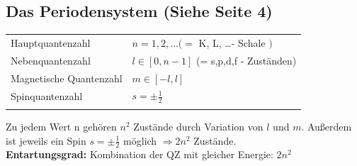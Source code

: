 \begin{sectionbox}
    \subsection{Das Periodensystem (Siehe Seite 4)}
    \begin{tabular*}{\columnwidth}{@{\extracolsep\fill}ll@{}}
        \ctrule
        Hauptquantenzahl &
        $n = 1, 2, \ldots (= $ K, L, \ldots - Schale $)$ \\
        Nebenquantenzahl &
        $l \in [0,n-1]$ (= s,p,d,f - Zuständen)\\
        Magnetische Quantenzahl &
        $m \in [-l,l]$\\
        Spinquantenzahl &
        $s = \pm \frac{1}{2}$ \\
        \ctrule
    \end{tabular*}
    Zu jedem Wert n gehören $n^2$ Zustände durch Variation von $l$ und $m$. Außerdem ist jeweils ein Spin $s = \pm \frac 1 2$ möglich $\Rightarrow 2n^2$ Zustände. \\
    \textbf{Entartungsgrad:} Kombination der QZ mit gleicher Energie: $2 n^2$
\end{sectionbox}

